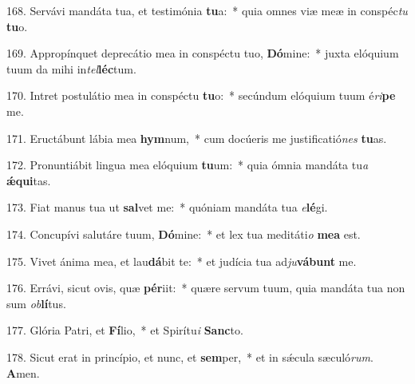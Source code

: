 168. Servávi mandáta tua, et testimónia \textbf{tu}a:~*  quia omnes viæ meæ in conspéc\textit{tu} \textbf{tu}o.\

169. Appropínquet deprecátio mea in conspéctu tuo, \textbf{Dó}mine:~*  juxta elóquium tuum da mihi in\textit{tel}\textbf{léc}tum.\

170. Intret postulátio mea in conspéctu \textbf{tu}o:~*  secúndum elóquium tuum é\textit{ri}\textbf{pe} me.\

171. Eructábunt lábia mea \textbf{hym}num,~*  cum docúeris me justificatió\textit{nes} \textbf{tu}as.\

172. Pronuntiábit lingua mea elóquium \textbf{tu}um:~*  quia ómnia mandáta tu\textit{a} \textbf{ǽ}\textbf{qui}tas.\

173. Fiat manus tua ut \textbf{sal}vet me:~*  quóniam mandáta tua \textit{e}\textbf{lé}gi.\

174. Concupívi salutáre tuum, \textbf{Dó}mine:~*  et lex tua meditáti\textit{o} \textbf{me}\textbf{a} est.\

175. Vivet ánima mea, et lau\textbf{dá}bit te:~*  et judícia tua ad\textit{ju}\textbf{vá}\textbf{bunt} me.\

176. Errávi, sicut ovis, quæ \textbf{pér}iit:~*  quære servum tuum, quia mandáta tua non sum \textit{ob}\textbf{lí}tus.\

177. Glória Patri, et \textbf{Fí}lio,~*  et Spirítu\textit{i} \textbf{Sanc}to.\

178. Sicut erat in princípio, et nunc, et \textbf{sem}per,~*  et in sǽcula sæculó\textit{rum}. \textbf{A}men.\

